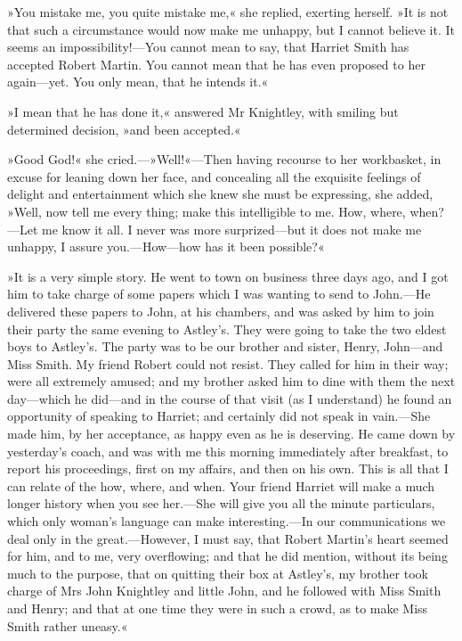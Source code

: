»You mistake me, you quite mistake me,« she replied, exerting herself. »It is not that such a circumstance would now make me unhappy, but I cannot believe it. It seems an impossibility!—You cannot mean to say, that Harriet Smith has accepted Robert Martin. You cannot mean that he has even proposed to her again—yet. You only mean, that he intends it.«

»I mean that he has done it,« answered Mr Knightley, with smiling but determined decision, »and been accepted.«

»Good God!« she cried.—»Well!«—Then having recourse to her workbasket, in excuse for leaning down her face, and concealing all the exquisite feelings of delight and entertainment which she knew she must be expressing, she added, »Well, now tell me every thing; make this intelligible to me. How, where, when?—Let me know it all. I never was more surprized—but it does not make me unhappy, I assure you.—How—how has it been possible?«

»It is a very simple story. He went to town on business three days ago, and I got him to take charge of some papers which I was wanting to send to John.—He delivered these papers to John, at his chambers, and was asked by him to join their party the same evening to Astley's. They were going to take the two eldest boys to Astley's. The party was to be our brother and sister, Henry, John—and Miss Smith. My friend Robert could not resist. They called for him in their way; were all extremely amused; and my brother asked him to dine with them the next day—which he did—and in the course of that visit (as I understand) he found an opportunity of speaking to Harriet; and certainly did not speak in vain.—She made him, by her acceptance, as happy even as he is deserving. He came down by yesterday's coach, and was with me this morning immediately after breakfast, to report his proceedings, first on my affairs, and then on his own. This is all that I can relate of the how, where, and when. Your friend Harriet will make a much longer history when you see her.—She will give you all the minute particulars, which only woman's language can make interesting.—In our communications we deal only in the great.—However, I must say, that Robert Martin's heart seemed for him, and to me, very overflowing; and that he did mention, without its being much to the purpose, that on quitting their box at Astley's, my brother took charge of Mrs John Knightley and little John, and he followed with Miss Smith and Henry; and that at one time they were in such a crowd, as to make Miss Smith rather uneasy.«


